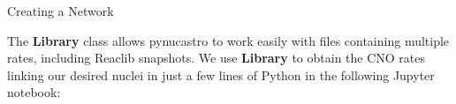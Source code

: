 \documentclass[final]{beamer}
\newlength{\onecolwid}
\newlength{\twocolwid}
\begin{document}
\begin{frame}[t]
\begin{columns}[t]
\begin{column}{\twocolwid}
\begin{columns}[t,totalwidth=\twocolwid] %

\begin{column}{\onecolwid}\vspace{-.6in} %


\begin{block}{Creating a Network}

The \textbf{Library} class allows pynucastro to work easily with files
containing multiple rates, including Reaclib snapshots. We use
\textbf{Library} to obtain the CNO rates linking our desired nuclei in
just a few lines of Python in the following Jupyter notebook:


\end{block}
\end{column}
\end{columns}
\end{column}
\end{columns}
\end{frame}
\end{document}
